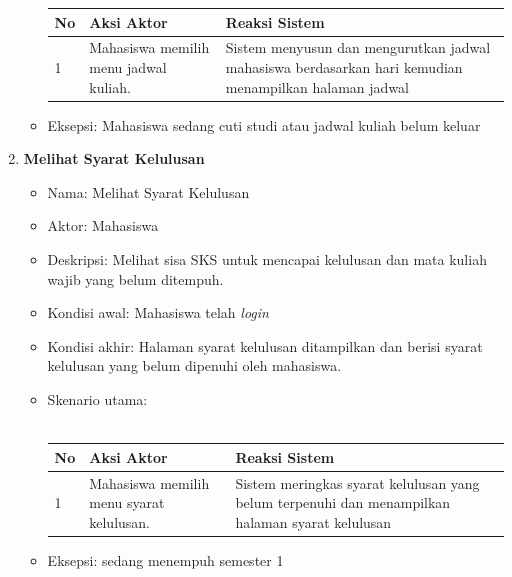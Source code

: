 \begin{enumerate}
\begin{itemize}
				\begin{tabular}{|p{0.5cm} |p{6cm}| p{6cm}|}
						\hline
							No 	& Aksi Aktor & Reaksi Sistem \\ \hline
							1 	& Mahasiswa memilih menu jadwal kuliah. 	&	Sistem menyusun dan mengurutkan jadwal mahasiswa berdasarkan hari kemudian menampilkan halaman jadwal \\ \hline 
						\end{tabular} 
			\item Eksepsi: Mahasiswa sedang cuti studi atau jadwal kuliah belum keluar
		\end{itemize}
	\item \textbf{Melihat Syarat Kelulusan}
		\begin{itemize}
			\item Nama: Melihat Syarat Kelulusan
			\item Aktor: Mahasiswa
			\item Deskripsi: Melihat sisa SKS untuk mencapai kelulusan dan mata kuliah wajib yang belum ditempuh.
			\item Kondisi awal: Mahasiswa telah \textit{login}
			\item Kondisi akhir: Halaman syarat kelulusan ditampilkan dan berisi syarat kelulusan yang belum dipenuhi oleh mahasiswa.
			\item Skenario utama: \\ \\
				\begin{tabular}{|p{0.5cm} |p{6cm}| p{6cm}|}
						\hline
							No 	& Aksi Aktor & Reaksi Sistem \\ \hline
							1 	& Mahasiswa memilih menu syarat kelulusan.	&	Sistem meringkas syarat kelulusan yang belum terpenuhi dan menampilkan halaman syarat kelulusan \\ \hline 
						\end{tabular} 
			\item Eksepsi: sedang menempuh semester 1
		\end{itemize}
\end{enumerate}

